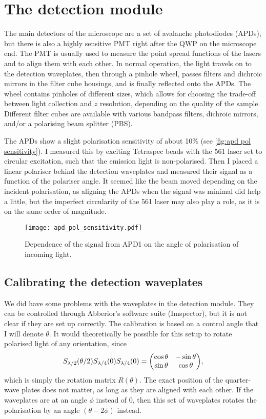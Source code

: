 \section{The detection module}

The main detectors of the microscope are a set of avalanche photodiodes (APDs), but there is also a highly sensitive PMT right after the QWP on the microscope end. The PMT is usually used to measure the point spread functions of the lasers and to align them with each other. In normal operation, the light travels on to the detection waveplates, then through a pinhole wheel, passes filters and dichroic mirrors in the filter cube housings, and is finally reflected onto the APDs. The wheel contains pinholes of different sizes, which allows for choosing the trade-off between light collection and $ z $ resolution, depending on the quality of the sample. Different filter cubes are available with various bandpass filters, dichroic mirrors, and/or a polarising beam splitter (PBS).

The APDs show a slight polarisation sensitivity of about 10\% (see \autoref{fig:apd pol sensitivity}). I measured this by exciting Tetraspec beads with the 561 laser set to circular excitation, such that the emission light is non-polarised. Then I placed a linear polariser behind the detection waveplates and measured their signal as a function of the polariser angle. It seemed like the beam moved depending on the incident polarisation, as aligning the APDs when the signal was minimal did help a little, but the imperfect circularity of the 561 laser may also play a role, as it is on the same order of magnitude. 

\begin{figure}
	\centering
	\texttt{[image: apd\_pol\_sensitivity.pdf]}
	\caption{Dependence of the signal from APD1 on the angle of polarisation of incoming light.}
	\label{fig:apd pol sensitivity}
\end{figure}

\subsection{Calibrating the detection waveplates}

We did have some problems with the waveplates in the detection module. They can be controlled through Abberior's software suite (Imspector), but it is not clear if they are set up correctly. The calibration is based on a control angle that I will denote $ \theta $. It would theoretically be possible for this setup to rotate polarised light of any orientation, since
\begin{equation}
	S_\hwp(\theta/2) S_\qwp(0) S_\qwp(0) = \mqty(\cos\theta & -\sin\theta \\ \sin\theta & \cos\theta ),
	\label{eq:detection waveplates}
\end{equation}
which is simply the rotation matrix $ R(\theta) $. The exact position of the quarter-wave plates does not matter, as long as they are aligned with each other. If the waveplates are at an angle $ \phi$ instead of 0, then this set of waveplates rotates the polarisation by an angle $ (\theta-2\phi) $ instead. 

